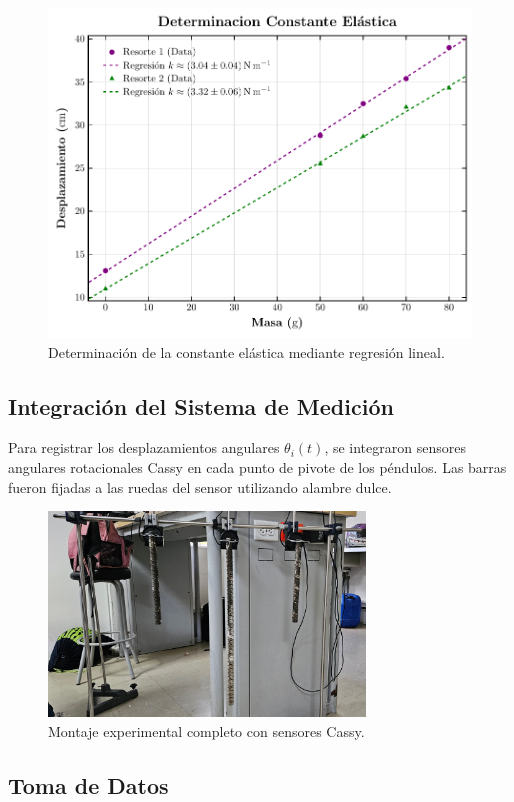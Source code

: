 \begin{figure}[htbp!]
    \centering
    \includegraphics[width=0.75\linewidth]{Figures/springs-plot.pdf}
    \caption{Determinación de la constante elástica mediante regresión lineal.}
    \label{fig:regresion}
\end{figure}

\subsection*{Integración del Sistema de Medición}

Para registrar los desplazamientos angulares $\theta_i(t)$, se integraron sensores angulares rotacionales Cassy en cada punto de pivote de los péndulos. Las barras fueron fijadas a las ruedas del sensor utilizando alambre dulce.

\begin{figure}[htbp!]
    \centering
    \includegraphics[width=0.75\textwidth]{Figures/set-up.jpeg}
    \caption{Montaje experimental completo con sensores Cassy.}
    \label{fig:montaje}
\end{figure}

\subsection{Toma de Datos}


